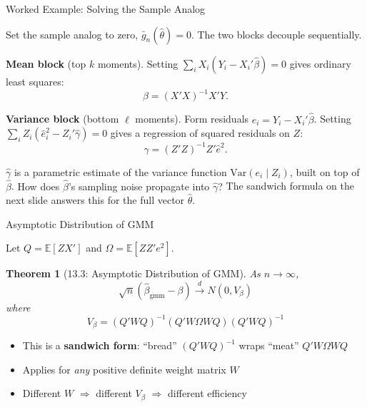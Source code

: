 \documentclass[aspectratio=169, handout, t]{beamer}
\newtheorem{thm}{Theorem}
\numberwithin{equation}{section}
\begin{document}
\begin{frame}{Worked Example: Solving the Sample Analog}

Set the sample analog to zero, $\bar g_n(\hat\theta) = 0$.  The two blocks decouple sequentially.

\medskip
\textbf{Mean block} (top $k$ moments).  Setting $\sum_i X_i(Y_i - X_i'\hat\beta) = 0$ gives ordinary least squares:
$$\hat\beta = (X'X)^{-1}X'Y.$$

\textbf{Variance block} (bottom $\ell$ moments).  Form residuals $\hat e_i = Y_i - X_i'\hat\beta$.  Setting $\sum_i Z_i(\hat e_i^2 - Z_i'\hat\gamma) = 0$ gives a regression of squared residuals on $Z$:
$$\hat\gamma = (Z'Z)^{-1}Z'\hat e^2.$$

\medskip
$\hat\gamma$ is a parametric estimate of the variance function $\mathrm{Var}(e_i \mid Z_i)$, built on top of $\hat\beta$.  \alert{How does $\hat\beta$'s sampling noise propagate into $\hat\gamma$?}  The sandwich formula on the next slide answers this for the full vector $\hat\theta$.

\end{frame}

\begin{frame}{Asymptotic Distribution of GMM}

Let $Q = \mathbb{E}[ZX']$ and $\Omega = \mathbb{E}[ZZ'e^2]$.

\begin{thm}[13.3: Asymptotic Distribution of GMM]
As $n \to \infty$,
$$\sqrt{n}(\hat\beta_{\text{gmm}} - \beta) \xrightarrow{d} N(0, V_\beta)$$
where
$$\boxed{V_\beta = (Q'WQ)^{-1}(Q'W\Omega WQ)(Q'WQ)^{-1}}$$
\end{thm}

\bigskip
\begin{itemize}
\item This is a \textbf{sandwich form}: ``bread'' $(Q'WQ)^{-1}$ wraps ``meat'' $Q'W\Omega WQ$
\item Applies for \textit{any} positive definite weight matrix $W$
\item Different $W$ $\Rightarrow$ different $V_\beta$ $\Rightarrow$ different efficiency
\end{itemize}

\end{frame}
\end{document}
